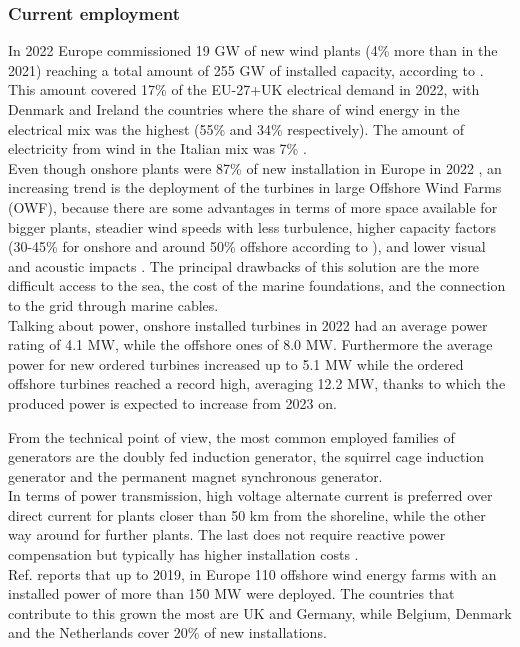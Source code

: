 \subsubsection{Current employment}
In 2022 Europe commissioned 19 $\si{\giga\watt}$ of new wind plants (4\% more than in the 2021) reaching a total amount of 255 $\si{\giga\watt}$ of installed capacity, according to \cite{wind_europe_data_2022}. This amount covered 17\% of the EU-27+UK electrical demand in 2022, with Denmark and Ireland the countries where the share of wind energy in the electrical mix was the highest (55\% and 34\% respectively). The amount of electricity from wind in the Italian mix was 7\% \cite{wind_europe_data_2022}.\\
Even though onshore plants were 87\% of new installation in Europe in 2022 \cite{wind_europe_data_2022}, an increasing trend is the deployment of the turbines in large Offshore Wind Farms (OWF), because there are some advantages in terms of more space available for bigger plants, steadier wind speeds with less turbulence, higher capacity factors (30-45\% for onshore and around 50\% offshore according to \cite{wind_europe_data_2022}), and lower visual and acoustic impacts \cite{current_staus_and_future_trends_of_offshore_wind_power_in_europe}. The principal drawbacks of this solution are the more difficult access to the sea, the cost of the marine foundations, and the connection to the grid through marine cables.  \\
Talking about power, onshore installed turbines in 2022 had an average power rating of 4.1 $\si{\mega\watt}$, while the offshore ones of 8.0 $\si{\mega\watt}$. Furthermore the average power for new ordered turbines increased up to 5.1 $\si{\mega\watt}$ while the ordered offshore turbines reached a record high, averaging 12.2 $\si{\mega\watt}$, thanks to which the produced power is expected to increase from 2023 on.

From the technical point of view, the most common employed families of generators are the doubly fed induction generator, the squirrel cage induction generator and the permanent magnet synchronous generator.\\
In terms of power transmission, high voltage alternate current is preferred over direct current for plants closer than 50 km from the shoreline, while the other way around for further plants. The last does not require reactive power compensation but typically has higher installation costs \cite{current_staus_and_future_trends_of_offshore_wind_power_in_europe}.\\
Ref. \cite{current_staus_and_future_trends_of_offshore_wind_power_in_europe} reports that up to 2019, in Europe 110 offshore wind energy farms with an installed power of more than 150 $\si{\mega\watt}$ were deployed. The countries that contribute to this grown the most are UK and Germany, while Belgium, Denmark and the Netherlands cover 20\% of new installations.

